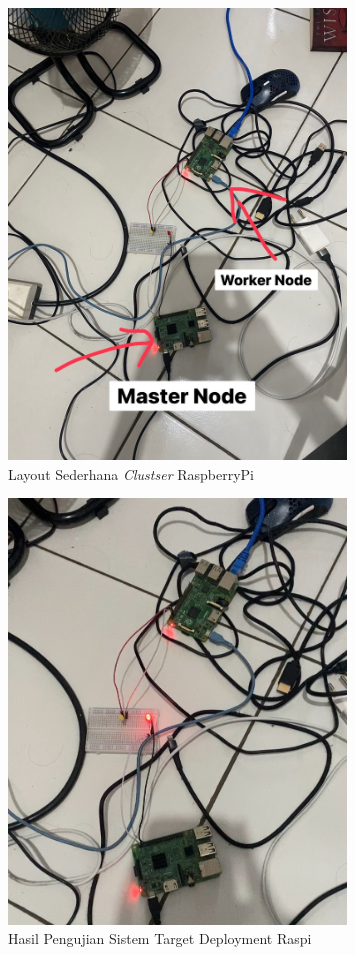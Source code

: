 \begin{figure}[ht]
  \centering
  \includegraphics[width=0.8\textwidth]{resources/chapter-4/pengujian/pengujian-sistem-raspi-layout.jpg}
  \caption{Layout Sederhana \textit{Clustser} RaspberryPi}
  \label{fig:pengujian-sistem-raspi-layout}
\end{figure}

\begin{figure}[ht]
  \centering
  \includegraphics[width=0.8\textwidth]{resources/chapter-4/pengujian/pengujian-sistem-raspi-hasil-a.jpg}
  \caption{Hasil Pengujian Sistem Target Deployment Raspi}
  \label{fig:hasil-pengujian-sistem-raspi-target}
\end{figure}

